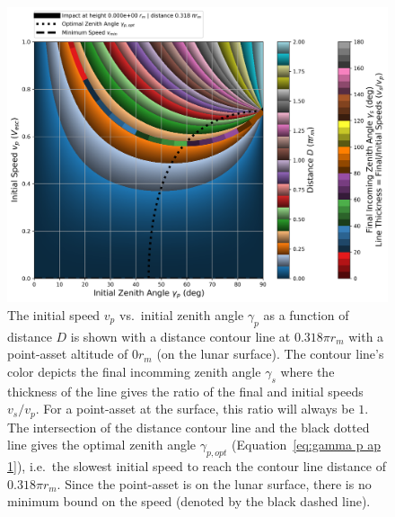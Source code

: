 \documentclass{article}
\begin{document}
\begin{figure}[!htb]
	\centering
	\includegraphics[width=1.00\linewidth]{dist_speed_zenith_plot_002_0.000e+00_1.000.png}
	\caption{The initial speed $v_p$ vs.\ initial zenith angle $\gamma_p$ as a function of distance $D$ is shown with a distance contour line at $0.318\pi r_m$ with a point-asset altitude of $0 r_m$ (on the lunar surface). The contour line's color depicts the final incomming zenith angle $\gamma_s$ where the thickness of the line gives the ratio of the final and initial speeds $v_s/v_p$. For a point-asset at the surface, this ratio will always be $1$. The intersection of the distance contour line and the black dotted line gives the optimal zenith angle $\gamma_{p,opt}$ (Equation~\eqref{eq:gamma p ap 1}), i.e.\ the slowest initial speed to reach the contour line distance of $0.318\pi r_m$. Since the point-asset is on the lunar surface, there is no minimum bound on the speed (denoted by the black dashed line).}\label{fig:dist_speed_zenith_plot_002_0.000e+00_1.000}
\end{figure}
\end{document}

